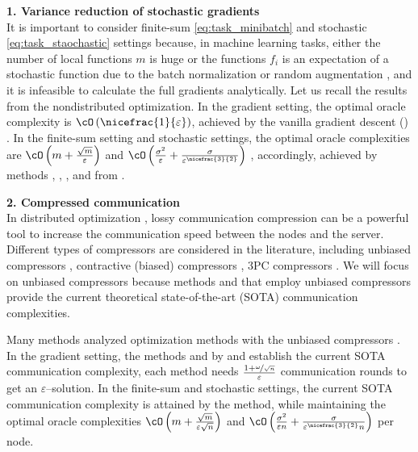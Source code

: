 \documentclass{article}
\begin{document}
\textbf{1. Variance reduction of stochastic gradients}\\
It is important to consider finite-sum \eqref{eq:task_minibatch} and stochastic \eqref{eq:task_staochastic} settings because, in machine learning tasks, either the number of local functions $m$ is huge or the functions $f_i$ is an expectation of a stochastic function due to the batch normalization \citep{ioffe2015batch} or random augmentation \citep{goodfellow2016deep}, and it is infeasible to calculate the full gradients analytically. Let us recall the results from the nondistributed optimization. In the gradient setting, the optimal oracle complexity is $\cO\left(\nicefrac{1}{\varepsilon}\right)$, achieved by the vanilla gradient descent () \citep{carmon2020lower, nesterov2018lectures}. In the finite-sum setting and stochastic settings, the optimal oracle complexities are $\cO\left(m + \frac{\sqrt{m}}{\varepsilon}\right)$ and $\cO\left(\frac{\sigma^2}{\varepsilon} + \frac{\sigma}{\varepsilon^{\nicefrac{3}{2}}}\right)$ \citep{SPIDER, PAGE, arjevani2019lower}, accordingly, achieved by methods , , , and  from \citep{SPIDER,SARAH,PAGE,cutkosky2019momentum}.

\textbf{2. Compressed communication} \\
In distributed optimization \citep{ramesh2021zero, xu2021grace}, lossy communication compression can be a powerful tool to increase the communication speed between the nodes and the server. Different types of compressors are considered in the literature, including unbiased compressors \citep{alistarh2017qsgd,beznosikov2020biased,szlendak2021permutation}, contractive (biased) compressors \citep{richtarik2021ef21}, 3PC compressors \citep{richtarik20223pc}. We will focus on unbiased compressors because methods  and  \citep{tyurin2022dasha, szlendak2021permutation, MARINA} that employ unbiased compressors provide the current theoretical state-of-the-art (SOTA) communication complexities.

Many methods analyzed optimization methods with the unbiased compressors \citep{alistarh2017qsgd, DIANA, horvath2019stochastic, MARINA, tyurin2022dasha}. In the gradient setting, the methods  and  by \cite{MARINA} and \cite{tyurin2022dasha} establish the current SOTA communication complexity, each method needs $\frac{1 + \nicefrac{\omega}{\sqrt{n}}}{\varepsilon}$ communication rounds to get an $\varepsilon$--solution. In the finite-sum and stochastic settings, the current SOTA communication complexity is attained by the  method, while maintaining the optimal oracle complexities $\cO\left(m + \frac{\sqrt{m}}{\varepsilon \sqrt{n}}\right)$ and $\cO\left(\frac{\sigma^2}{\varepsilon n} + \frac{\sigma}{\varepsilon^{\nicefrac{3}{2}} n}\right)$ per node.
\end{document}
